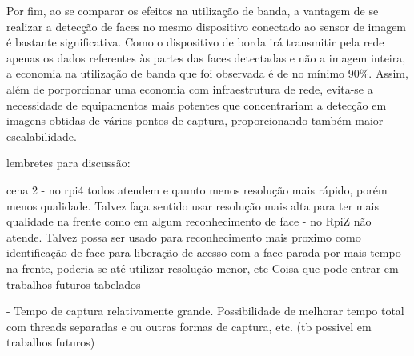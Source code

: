 Por fim, ao se comparar os efeitos na utilização de banda, a vantagem de se realizar a detecção de faces no mesmo dispositivo conectado ao sensor de imagem é bastante significativa. Como o dispositivo de borda irá transmitir pela rede apenas os dados referentes às partes das faces detectadas e não a imagem inteira, a economia na utilização de banda que foi observada é de no mínimo 90\%. Assim, além de porporcionar uma economia com infraestrutura de rede, evita-se a necessidade de equipamentos mais potentes que concentrariam a detecção em imagens obtidas de vários pontos de captura, proporcionando também maior escalabilidade.

lembretes para discussão:

cena 2
- no rpi4 todos atendem e qaunto menos resolução mais rápido, porém menos qualidade. Talvez faça sentido usar resolução mais alta para ter mais qualidade na frente como em algum reconhecimento de face
- no RpiZ não atende. Talvez possa ser usado para reconhecimento mais proximo como identificação de face para liberação de acesso com a face parada por mais tempo na frente, poderia-se até utilizar resolução menor, etc Coisa que pode entrar em trabalhos futuros tabelados

- Tempo de captura relativamente grande. Possibilidade de melhorar tempo total com threads separadas e ou outras formas de captura, etc. (tb possivel em trabalhos futuros)